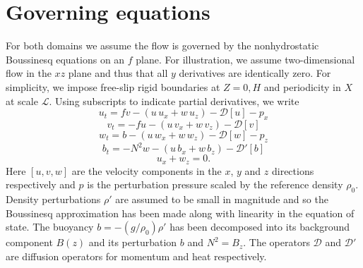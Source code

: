 \documentclass{jfm-like}
\begin{document}
\section{Governing equations}
For both domains we assume the flow is governed by the nonhydrostatic Boussinesq equations on an $f$ plane. For illustration, we assume two-dimensional flow in the $xz$ plane and thus that all $y$ derivatives
are identically zero. For simplicity, we impose free-slip rigid boundaries at $Z=0,H$ and periodicity in $X$ at scale $\mathcal{L}$. Using subscripts to indicate partial derivatives, we write
\begin{equation}
u_t = fv - (u\,u_x + w\,u_z) - {\mathcal D}[u] - p_x
\label{eq:umom}
\end{equation}
\begin{equation}
v_t =  -fu - (u\,v_x + w\,v_z) - {\mathcal D}[v] 
\label{eq:vmom}
\end{equation}
\begin{equation}
w_t =  b  - (u\,w_x + w\,w_z) - {\mathcal D}[w]  - p_z
\label{eq:wmom}
\end{equation}
\begin{equation}
b_t =  -N^2 w  - (u\,b_x + w\,b_z) - {\mathcal D'}[b]  
\label{eq:buoy}
\end{equation}
\begin{equation}
u_x + w_z = 0.
\label{eq:cont}
\end{equation}
Here $[u,v,w]$ are the velocity components in the $x$, $y$ and $z$ directions respectively and $p$ is the perturbation pressure scaled by the reference density $\rho_0$. Density perturbations $\rho'$
are assumed to be small in magnitude and so the Boussinesq approximation has been made along with linearity in the equation of state.
The buoyancy $b=-(g/\rho_0)\rho'$ has been decomposed into its background component $B(z)$ and its perturbation $b$ and $N^2 = B_z$.
The operators ${\mathcal D}$ and  ${\mathcal D'}$ are diffusion operators for momentum and heat respectively.
\end{document}
